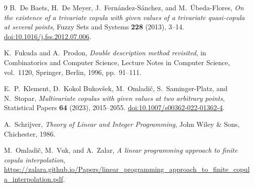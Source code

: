 \documentclass[a4paper,11pt]{amsart}
\numberwithin{equation}{section}
\theoremstyle{definition}
\theoremstyle{remark}
\begin{document}
\begin{thebibliography}{9}
B.~De Baets, H.~De Meyer, J.~Fern\'andez-S\'anchez, and M.~\'Ubeda-Flores,
\emph{On the existence of a trivariate copula with given values of a
trivariate quasi-copula at several points},
Fuzzy Sets and Systems \textbf{228} (2013), 3--14.
\href{https://doi.org/10.1016/j.fss.2012.07.006}{doi:10.1016/j.fss.2012.07.006}.

K.~Fukuda and A.~Prodon,
\emph{Double description method revisited},
in Combinatorics and Computer Science,
Lecture Notes in Computer Science, vol.~1120,
Springer, Berlin, 1996, pp.~91--111.

E.~P.~Klement, D.~Kokol Bukov\v{s}ek, M.~Omladi\v{c},
S.~Saminger-Platz, and N.~Stopar,
\emph{Multivariate copulas with given values at two arbitrary points},
Statistical Papers \textbf{64} (2023), 2015--2055.
\href{https://doi.org/10.1007/s00362-022-01362-4}{doi:10.1007/s00362-022-01362-4}.

A.~Schrijver,
\emph{Theory of Linear and Integer Programming},
John Wiley \& Sons, Chichester, 1986.

M.~Omladi\v{c}, M.~Vuk, and A.~Zalar,
\emph{A linear programming approach to finite copula interpolation},
\url{https://zalara.github.io/Papers/linear_programming_approach_to_finite_copula_interpolation.pdf}.
\end{thebibliography}
\end{document}
